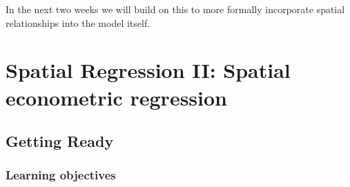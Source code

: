 \documentclass[
]{book}
\begin{document}
In the next two weeks we will build on this to more formally incorporate spatial relationships into the model itself.

\hypertarget{spatial-regression-ii-spatial-econometric-regression}{%
\chapter{Spatial Regression II: Spatial econometric regression}\label{spatial-regression-ii-spatial-econometric-regression}}

\hypertarget{getting-ready-9}{%
\section{Getting Ready}\label{getting-ready-9}}

\hypertarget{learning-objectives-10}{%
\subsection{Learning objectives}\label{learning-objectives-10}}

 
  \providecommand{\huxb}[2]{\arrayrulecolor[RGB]{#1}\global\arrayrulewidth=#2pt}
  \providecommand{\huxvb}[2]{\color[RGB]{#1}\vrule width #2pt}
  \providecommand{\huxtpad}[1]{\rule{0pt}{#1}}
  \providecommand{\huxbpad}[1]{\rule[-#1]{0pt}{#1}}
\end{document}
